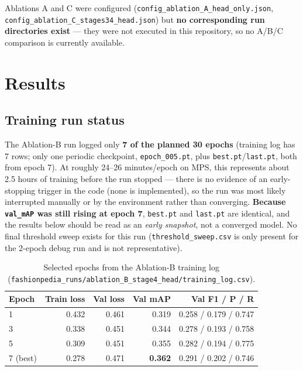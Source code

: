 \documentclass[11pt]{article}
\newcommand{\code}[1]{\texttt{\small #1}}
\begin{document}
Ablations A and C were configured (\code{config\_ablation\_A\_head\_only.json}, \code{config\_ablation\_C\_stages34\_head.json}) but \textbf{no corresponding run directories exist} --- they were not executed in this repository, so no A/B/C comparison is currently available.

\section{Results}
\label{sec:results}

\subsection{Training run status}

The Ablation-B run logged only \textbf{7 of the planned 30 epochs} (training log has 7 rows; only one periodic checkpoint, \code{epoch\_005.pt}, plus \code{best.pt}/\code{last.pt}, both from epoch 7). At roughly 24--26 minutes/epoch on MPS, this represents about 2.5 hours of training before the run stopped --- there is no evidence of an early-stopping trigger in the code (none is implemented), so the run was most likely interrupted manually or by the environment rather than converging. \textbf{Because \code{val\_mAP} was still rising at epoch 7}, \code{best.pt} and \code{last.pt} are identical, and the results below should be read as an \emph{early snapshot}, not a converged model. No final threshold sweep exists for this run (\code{threshold\_sweep.csv} is only present for the 2-epoch debug run and is not representative).

\begin{table}[h]
\centering
\begin{tabular}{lrrrr}
\toprule
\textbf{Epoch} & \textbf{Train loss} & \textbf{Val loss} & \textbf{Val mAP} & \textbf{Val F1 / P / R} \\
\midrule
1 & 0.432 & 0.461 & 0.319 & 0.258 / 0.179 / 0.747 \\
3 & 0.338 & 0.451 & 0.344 & 0.278 / 0.193 / 0.758 \\
5 & 0.309 & 0.451 & 0.355 & 0.282 / 0.194 / 0.775 \\
\rowcolor{cobalt!8} 7 (best) & 0.278 & 0.471 & \textbf{0.362} & 0.291 / 0.202 / 0.746 \\
\bottomrule
\end{tabular}
\caption{Selected epochs from the Ablation-B training log (\code{fashionpedia\_runs/ablation\_B\_stage4\_head/training\_log.csv}).}
\label{tab:results-table}
\end{table}
\end{document}
